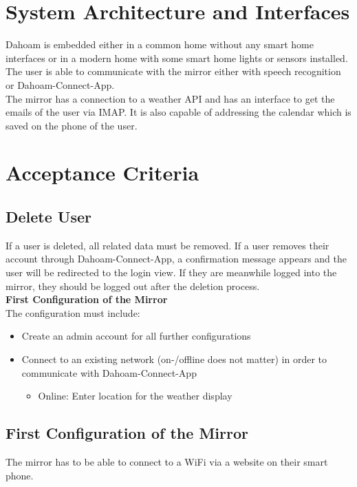 \documentclass[12pt]{article}
\theoremstyle{definition}
\begin{document}
\pagebreak
\section{System Architecture and Interfaces}
Dahoam is embedded either in a common home without any smart home interfaces or in a modern home with some smart home lights or sensors installed.\\
The user is able to communicate with the mirror either with speech recognition or Dahoam-Connect-App. \\
The mirror has a connection to a weather API and has an interface to get the emails of the user via IMAP. It is also capable of addressing the calendar which is saved on the phone of the user. \\


\pagebreak
\section{Acceptance Criteria}
\subsection{Delete User}
If a user is deleted, all related data must be removed. If a user removes their account through Dahoam-Connect-App, a confirmation message appears and the user will be redirected to the login view. If they are meanwhile logged into the mirror, they should be logged out after the deletion process. \\
\newline
\textbf{First Configuration of the Mirror}\\
The configuration must include:
\begin{itemize}
    \item Create an admin account for all further configurations
    \item Connect to an existing network (on-/offline does not matter) in order to communicate with Dahoam-Connect-App
    \begin{itemize}
        \item Online: Enter location for the weather display
    \end{itemize} 
\end{itemize}
\subsection{First Configuration of the Mirror}
The mirror has to be able to connect to a WiFi via a website on their smart phone.
\end{document}
